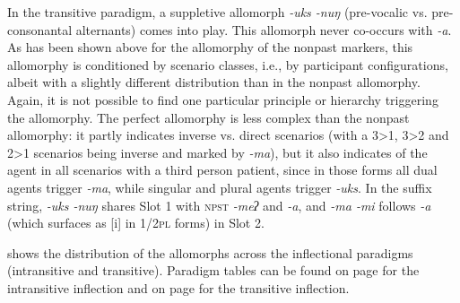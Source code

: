 In the transitive paradigm, a suppletive allomorph \emph{-uks \ti -nuŋ} (pre-vocalic vs. pre-consonantal alternants) comes into play. This allomorph never co-occurs with \emph{-a}. As has been shown above for the allomorphy of the nonpast markers, this allomorphy is conditioned by scenario classes, i.e., by participant configurations, albeit with a slightly different distribution than in the nonpast allomorphy. Again, it is  not possible to find one particular  principle or hierarchy triggering the allomorphy. The perfect allomorphy is less complex than the nonpast allomorphy: it partly indicates inverse vs. direct scenarios (with a 3>1, 3>2 and 2>1 scenarios being inverse and marked by \emph{-ma}), but it also indicates  of the agent in all scenarios with a third person patient, since in those forms all dual agents trigger \emph{-ma}, while singular and plural agents trigger \emph{-uks}. In the suffix string, \emph{-uks \ti -nuŋ} shares Slot 1 with {\scshape npst} \emph{-meʔ} and   \emph{-a}, and \emph{-ma \ti -mi} follows  \emph{-a} (which surfaces as [i] in {\scshape  1/2pl} forms)  in Slot 2.

 shows the distribution of the allomorphs across the inflectional paradigms (intransitive and transitive). Paradigm tables can be found on page \pageref{par-apma-pst} for the intransitive inflection and on page \pageref{par-chimd-prf} for the transitive inflection. 

